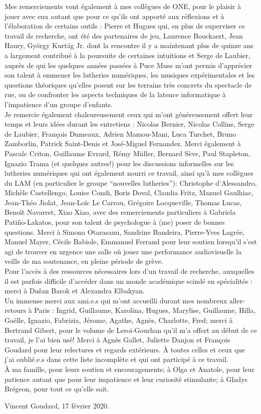 \indent Mes remerciements vont également à mes collègues de ONE, pour le plaisir à jouer avec eux autant que pour ce qu'ils ont apporté aux réflexions et à l'élaboration de certains outils : Pierre et Hugues qui, en plus de superviser ce travail de recherche, ont été des partenaires de jeu, Laurence Bouckaert, Jean Haury, György Kurtág Jr. dont la rencontre il y a maintenant plus de quinze ans a largement contribué à la poursuite de certaines intuitions et Serge de Laubier, auprès de qui les quelques années passées à Puce Muse m'ont permis d'apprécier son talent à emmener les lutheries numériques, les musiques expérimentales et les questions théoriques qu'elles posent sur les terrains très concrets du spectacle de rue, ou de confronter les aspects techniques de la latence informatique à l'impatience d'un groupe d'enfants.\\
\indent Je remercie également chaleureusement ceux qui m'ont généreusement offert leur temps et leurs idées durant les entretiens : Nicolas Bernier, Nicolas Collins, Serge de Laubier, François Dumeaux, Adrien Mamou-Mani, Luca Turchet, Bruno Zamborlin, Patrick Saint-Denis et José-Miguel Fernandez. Merci également à Pascale Criton, Guillaume Evrard, Rémy Müller, Bernard Sève, Paul Stapleton, Ignazio Trama (et quelques autres!) pour les discussions informelles sur les lutheries numériques qui ont également nourri ce travail, ainsi qu'à mes collègues du LAM (en particulier le groupe ``nouvelles lutheries''): Christophe d'Alessandro, Michèle Castellengo, Louise Condi, Boris Doval, Claudia Fritz, Manuel Gaulhiac, Jean-Théo Jiolat, Jean-Loïc Le Carrou, Grégoire Locqueville, Thomas Lucas, Benoît Navarret, Xiao Xiao, avec des remerciements particuliers à Gabriela Patiño-Lakatos, pour son talent de psychologue à (me) poser de bonnes questions. Merci à Simona Otarasanu, Sandrine Bandeira, Pierre-Yves Lagrée, Manuel Mayer, Cécile Babiole, Emmanuel Ferrand pour leur soutien lorsqu'il s'est agi de trouver en urgence une salle où jouer une performance audiovisuelle la veille de ma soutenance, en pleine période de grève.\\
\indent Pour l'accès à des ressources nécessaires lors d'un travail de recherche, auxquelles il est parfois difficile d'accéder dans un monde académique scindé en spécialités : merci à Dušan Barok et Alexandra Elbakyan.\\
\indent Un immense merci aux ami.e.s qui m'ont accueilli durant mes nombreux aller-retours à Paris : Ingrid, Guillaume, Karolina, Hugues, Marylise, Guillaume, Hilla, Gaëlle, Ignazio, Fabrizia, Jérome, Agathe, Agnès, Charlotte, Fred; merci à Bertrand Gibert, pour le volume de Leroi-Gourhan qu'il m'a offert au début de ce travail, je l'ai bien usé! Merci à Agnès Gallet, Juliette Danjon et François Goudard pour leur relectures et regards extérieurs. À toutes celles et ceux que j'ai oublié.e.s dans cette liste incomplète et qui ont participé à ce travail.\\
\indent À ma famille, pour leurs soutien et encouragements; à Olga et Anatole, pour leur patience autant que pour leur impatience et leur curiosité stimulante; à Gladys Brégeon, pour tout ce qu'elle sait.
\begin{flushright}
Vincent Goudard, 17 février 2020.
\end{flushright}